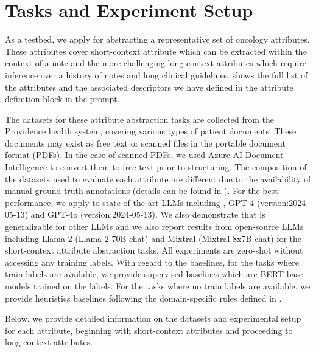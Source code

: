 
\section{Tasks and Experiment Setup}
As a testbed, we apply \ours for abstracting a representative set of oncology attributes. These attributes cover short-context attribute which can be extracted within the context of a note and the more challenging long-context attributes which require inference over a history of notes and long clinical guidelines.  shows the full list of the attributes and the associated descriptors we have defined in the attribute definition block in the prompt. 

The datasets for these attribute abstraction tasks are collected from the Providence health system, covering various types of patient documents. These documents may exist as free text or scanned files in the portable document format (PDFs). In the case of scanned PDFs, we used Azure AI Document Intelligence to convert them to free text prior to structuring. The composition of the datasets used to evaluate each attribute are different due to the availability of manual ground-truth annotations (details can be found in ). For the best performance, we apply \ours to state-of-the-art \acp{LLM} including , GPT-4 (version:2024-05-13) and GPT-4o (version:2024-05-13). We also demonstrate that \ours is generalizable for other \acp{LLM} and we also report results from open-source \acp{LLM} including Llama 2 (Llama 2 70B chat) and Mixtral (Mixtral 8x7B chat) for the short-context attribute abstraction tasks. All \ours experiments are zero-shot without accessing any training labels.
With regard to the baselines, for the tasks where train labels are available, we provide supervised baselines which are BERT base models trained on the labels. For the tasks where no train labels are available, we provide heuristics baselines following the domain-specific rules defined in \citet{gonzalez2023trialscope}.

Below, we provide detailed information on the datasets and experimental setup for each attribute, beginning with short-context attributes and proceeding to long-context attributes.

